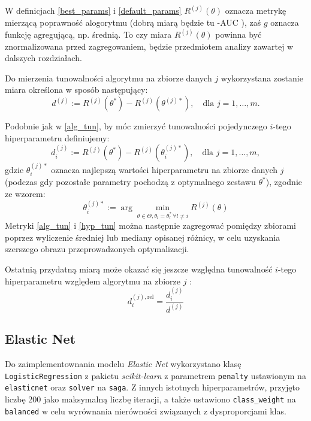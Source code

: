 \documentclass[a4paper,11pt]{article}
\begin{document}
W definicjach \eqref{best_params} i \eqref{default_params} $R^{(j)}(\theta)$ oznacza metrykę mierzącą poprawność alogorytmu (dobrą miarą będzie tu -AUC \cite{AUC}), zaś $g$ oznacza funkcję agregującą, np. średnią. To czy miara $R^{(j)}(\theta)$ powinna być znormalizowana przed zagregowaniem, będzie przedmiotem analizy zawartej w dalszych rozdziałach.

Do mierzenia tunowalności algorytmu na zbiorze danych $j$ wykorzystana zostanie miara określona w sposób następujący:
\begin{equation}
    \label{alg_tun}
    d^{(j)} := R^{(j)}(\theta^*) - R^{(j)}(\theta^{(j)*}), \quad \text{dla } j = 1, \ldots, m.
\end{equation}

Podobnie jak w \eqref{alg_tun}, by móc zmierzyć tunowalności pojedynczego $i$-tego hiperparametru definiujemy:
\begin{equation}
    \label{hyp_tun}
    d^{(j)}_i := R^{(j)}(\theta^*) - R^{(j)}(\theta^{(j)*}_i), \quad \text{dla } j = 1, \ldots, m, 
\end{equation}
gdzie $\theta^{(j)*}_i$ oznacza najlepszą wartości hiperparametru na zbiorze danych $j$ (podczas gdy pozostałe parametry pochodzą z optymalnego zestawu $\theta^*$), zgodnie ze wzorem:
\begin{equation*}
    \theta^{(j)*}_i := \arg \min_{\theta \in \Theta, \theta_l = \theta^*_l \, \forall l \neq i} R^{(j)}(\theta)
\end{equation*}
Metryki \eqref{alg_tun} i \eqref{hyp_tun} można następnie zagregować pomiędzy zbiorami poprzez wyliczenie średniej lub mediany opisanej różnicy, w celu uzyskania szerszego obrazu przeprowadzonych optymalizacji.

Ostatnią przydatną miarą może okazać się jeszcze względna tunowalność $i$-tego hiperparametru względem algorytmu na zbiorze $j$ :
\begin{equation}
    \label{wzg_tun}
    d^{(j), \text{rel}}_i = \frac{d^{(j)}_i}{d^{(j)}}
\end{equation}

\subsection{Elastic Net}
\label{sec:elnet}
Do zaimplementownania modelu \textit{Elastic Net}\cite{elnet} wykorzystano klasę \texttt{LogisticRegression} z pakietu \textit{scikit-learn} z parametrem \texttt{penalty} ustawionym na \texttt{elasticnet} oraz \texttt{solver} na \texttt{saga}. Z innych istotnych hiperparametrów, przyjęto liczbę 200 jako maksymalną liczbę iteracji, a także ustawiono \texttt{class\_weight} na \texttt{balanced} w celu wyrównania nierówności związanych z dysproporcjami klas.
\end{document}
